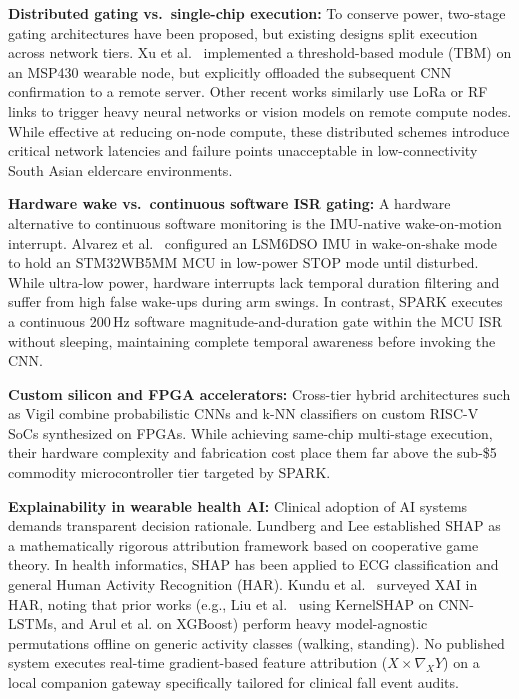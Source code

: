 \textbf{Distributed gating vs.\ single-chip execution:} To conserve power, two-stage gating architectures have been proposed, but existing designs split execution across network tiers. Xu et al.\ \cite{xu2021fusion} implemented a threshold-based module (TBM) on an MSP430 wearable node, but explicitly offloaded the subsequent CNN confirmation to a remote server. Other recent works similarly use LoRa or RF links to trigger heavy neural networks or vision models on remote compute nodes. While effective at reducing on-node compute, these distributed schemes introduce critical network latencies and failure points unacceptable in low-connectivity South Asian eldercare environments.

\textbf{Hardware wake vs.\ continuous software ISR gating:} A hardware alternative to continuous software monitoring is the IMU-native wake-on-motion interrupt. Alvarez et al.\ \cite{sensors2025wearable} configured an LSM6DSO IMU in wake-on-shake mode to hold an STM32WB5MM MCU in low-power STOP mode until disturbed. While ultra-low power, hardware interrupts lack temporal duration filtering and suffer from high false wake-ups during arm swings. In contrast, SPARK executes a continuous 200\,Hz software magnitude-and-duration gate within the MCU ISR without sleeping, maintaining complete temporal awareness before invoking the CNN.

\textbf{Custom silicon and FPGA accelerators:} Cross-tier hybrid architectures such as Vigil \cite{vigil2024fpga} combine probabilistic CNNs and k-NN classifiers on custom RISC-V SoCs synthesized on FPGAs. While achieving same-chip multi-stage execution, their hardware complexity and fabrication cost place them far above the sub-\$5 commodity microcontroller tier targeted by SPARK.

\textbf{Explainability in wearable health AI:} Clinical adoption of AI systems demands transparent decision rationale. Lundberg and Lee \cite{lundberg2017shap} established SHAP as a mathematically rigorous attribution framework based on cooperative game theory. In health informatics, SHAP has been applied to ECG classification \cite{yao2021interpretation} and general Human Activity Recognition (HAR). Kundu et al.\ \cite{kundu2025explainable} surveyed XAI in HAR, noting that prior works (e.g., Liu et al.\ \cite{liu2024explainable} using KernelSHAP on CNN-LSTMs, and Arul et al. on XGBoost) perform heavy model-agnostic permutations offline on generic activity classes (walking, standing). No published system executes real-time gradient-based feature attribution ($X \times \nabla_X Y$) on a local companion gateway specifically tailored for clinical fall event audits.

